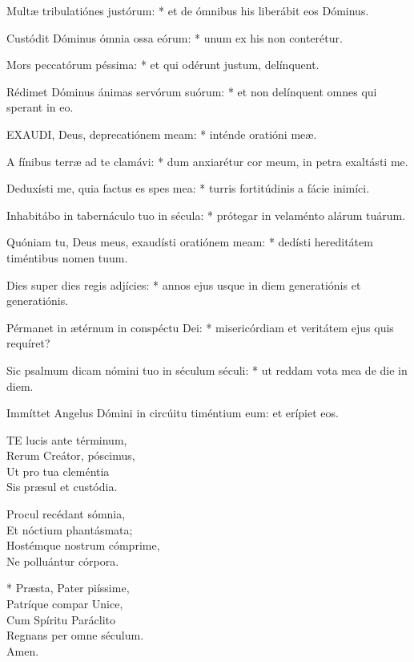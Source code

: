 Multæ tribulatiónes justórum: * et de ómnibus his liberábit eos Dóminus.

Custódit Dóminus ómnia ossa eórum: * unum ex his non conterétur.

Mors peccatórum péssima: * et qui odérunt justum, delínquent.

Rédimet Dóminus ánimas servórum suórum: * et non delínquent omnes qui sperant in eo.


\lettrine[lines=2]{E}{XAUDI}, Deus, deprecatiónem meam: * inténde oratióni meæ.

A fínibus terræ ad te clamávi: * dum anxiarétur cor meum, in petra exaltásti me.

Deduxísti me, quia factus es spes mea: * turris fortitúdinis a fácie inimíci.

Inhabitábo in tabernáculo tuo in sécula: * prótegar in velaménto alárum tuárum.

Quóniam tu, Deus meus, exaudísti oratiónem meam: * dedísti hereditátem timéntibus nomen tuum.

Dies super dies regis adjícies: * annos ejus usque in diem generatiónis et generatiónis.

Pérmanet in ætérnum in conspéctu Dei: * misericórdiam et veritátem ejus quis requíret?

Sic psalmum dicam nómini tuo in séculum séculi: * ut reddam vota mea de die in diem.

 Immíttet Angelus Dómini in circúitu timéntium eum: et erípiet eos.


\lettrine[lines=2]{T}{E} lucis ante términum,\\
Rerum Creátor, póscimus,\\
Ut pro tua cleméntia\\
Sis præsul et custódia.

Procul recédant sómnia,\\
Et nóctium phantásmata;\\
Hostémque nostrum cómprime,\\
Ne polluántur córpora.

* Præsta, Pater piíssime,\\
Patríque compar Unice,\\
Cum Spíritu Paráclito\\
Regnans per omne séculum.\\
Amen.


